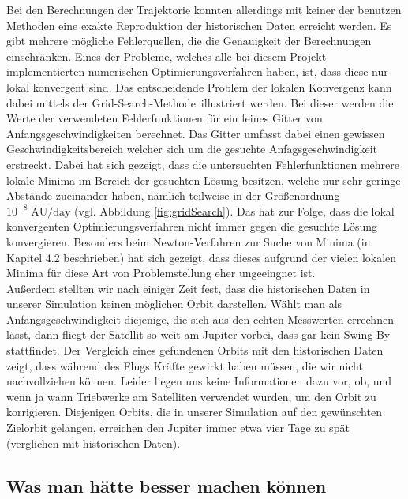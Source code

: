 Bei den Berechnungen der Trajektorie konnten allerdings mit keiner der benutzen Methoden eine exakte Reproduktion der historischen Daten erreicht werden. Es gibt mehrere mögliche Fehlerquellen, die die Genauigkeit der Berechnungen einschränken. Eines der Probleme, welches alle bei diesem Projekt implementierten numerischen Optimierungsverfahren haben, ist, dass diese nur lokal konvergent sind. Das entscheidende Problem der lokalen Konvergenz kann dabei mittels der \glqq Grid-Search-Methode\grqq\, illustriert werden. Bei dieser werden die Werte der verwendeten Fehlerfunktionen für ein feines Gitter von Anfangsgeschwindigkeiten berechnet. Das Gitter umfasst dabei einen gewissen Geschwindigkeitsbereich welcher sich um die gesuchte Anfagsgeschwindigkeit erstreckt. Dabei hat sich gezeigt, dass die untersuchten Fehlerfunktionen mehrere lokale Minima im Bereich der gesuchten Lösung besitzen, welche nur sehr geringe Abstände zueinander haben, nämlich teilweise in der Größenordnung $10^{-8}\;\text{AU/day}$ (vgl. Abbildung \ref{fig:gridSearch}). Das hat zur Folge, dass die lokal konvergenten Optimierungsverfahren nicht immer gegen die gesuchte Lösung konvergieren. Besonders beim Newton-Verfahren zur Suche von Minima (in Kapitel 4.2 beschrieben) hat sich gezeigt, dass dieses aufgrund der vielen lokalen Minima für diese Art von Problemstellung eher ungeeingnet ist.\\
Außerdem stellten wir nach einiger Zeit fest, dass die historischen Daten in unserer Simulation keinen möglichen Orbit darstellen. Wählt man als Anfangsgeschwindigkeit diejenige, die sich aus den echten Messwerten errechnen lässt, dann fliegt der Satellit so weit am Jupiter vorbei, dass gar kein Swing-By stattfindet. Der Vergleich eines gefundenen Orbits mit den historischen Daten zeigt, dass während des Flugs Kräfte gewirkt haben müssen, die wir nicht nachvollziehen können. Leider liegen uns keine Informationen dazu vor, ob, und wenn ja wann Triebwerke am Satelliten verwendet wurden, um den Orbit zu korrigieren. Diejenigen Orbits, die in unserer Simulation auf den gewünschten Zielorbit gelangen, erreichen den Jupiter immer etwa vier Tage zu spät (verglichen mit historischen Daten).

\subsection{Was man hätte besser machen können}

